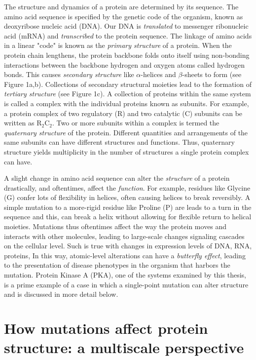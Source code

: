 \documentclass[12pt]{ucsddissertation}
\begin{document}
\begin{dissertationintroduction}
The structure and dynamics of a protein are determined by its sequence. The amino acid sequence is specified by the genetic code of the organism, known as deoxyribose nucleic acid (DNA). Our DNA is \textit{translated} to messenger ribonucleic acid (mRNA) and \textit{transcribed} to the protein sequence. The linkage of amino acids in a linear "code" is known as the \textit{primary structure} of a protein. When the protein chain lengthens, the protein backbone folds onto itself using non-bonding interactions between the backbone hydrogen and oxygen atoms called hydrogen bonds. This causes \textit{secondary structure} like $\alpha$-helices and $\beta$-sheets to form (see Figure 1a,b). Collections of secondary structural moieties lead to the formation of \textit{tertiary structure} (see Figure 1c). A collection of proteins within the same system is called a complex with the individual proteins known as subunits. For example, a protein complex of two regulatory (R) and two catalytic (C) subunits can be written as R$_{2}$C$_{2}$. Two or more subunits within a complex is termed the \textit{quaternary structure} of the protein. Different quantities and arrangements of the same subunits can have different structures and functions. Thus, quaternary structure yields multiplicity in the number of structures a single protein complex can have. 

A slight change in amino acid sequence can alter the \textit{structure} of a protein drastically, and oftentimes, affect the \textit{function}. For example, residues like Glycine (G) confer lots of flexibility in helices, often causing helices to break reversibly. A simple mutation to a more-rigid residue like Proline (P) are leads to a turn in the sequence and this, can break a helix without allowing for flexible return to helical moieties. Mutations thus oftentimes affect the way the protein moves and interacts with other molecules, leading to large-scale changes signaling cascades on the cellular level. Such is true with changes in expression levels of DNA, RNA, proteins, In this way, atomic-level alterations can have a \textit{butterfly effect}, leading to the presentation of disease phenotypes in the organism that harbors the mutation. Protein Kinase A (PKA), one of the systems examined by this thesis, is a prime example of a case in which a single-point mutation can alter structure and is discussed in more detail below.

\section{How mutations affect protein structure: a multiscale perspective}


\end{dissertationintroduction}
\end{document}
